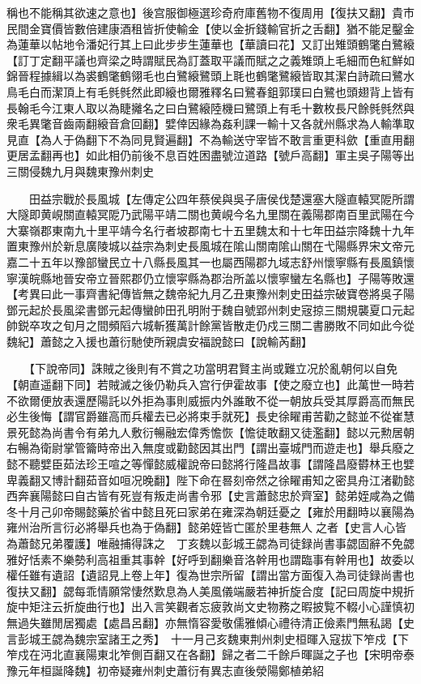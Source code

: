 稱也不能稱其欲速之意也】後宫服御極選珍奇府庫舊物不復周用【復扶又翻】貴市民間金寶價皆數倍建康酒租皆折使輸金【使以金折錢輸官折之舌翻】猶不能足鑿金為蓮華以帖地令潘妃行其上曰此步步生蓮華也【華讀曰花】又訂出雉頭鶴氅白鷺縗【訂丁定翻平議也齊梁之時謂賦民為訂蓋取平議而賦之之義雉頭上毛細而色紅鮮如錦晉程據緝以為裘鶴氅鶴翎毛也白鷺縗鷺頭上毦也鶴氅鷺縗皆取其潔白詩疏曰鷺水鳥毛白而潔頂上有毛毿毿然此即縗也爾雅釋名曰鷺春鉏郭璞曰白鷺也頭翅背上皆有長翰毛今江東人取以為睫攡名之曰白鷺縗陸機曰鷺頭上有毛十數枚長尺餘毿毿然與衆毛異氅音齒兩翻縗音倉回翻】嬖倖因緣為姦利課一輸十又各就州縣求為人輸準取見直【為人于偽翻下不為同見賢遍翻】不為輸送守宰皆不敢言重更科歛【重直用翻更居孟翻再也】如此相仍前後不息百姓困盡號泣道路【號戶高翻】軍主吳子陽等出三關侵魏九月與魏東豫州刺史

　　田益宗戰於長風城【左傳定公四年蔡侯與吳子唐侯伐楚還塞大隧直轅冥阸所謂大隧即黄峴關直轅冥阸乃武陽平靖二關也黄峴今名九里關在義陽郡南百里武陽在今大寨嶺郡東南九十里平靖今名行者坡郡南七十五里魏太和十七年田益宗降魏十九年置東豫州於新息廣陵城以益宗為刺史長風城在隂山關南隂山關在弋陽縣界宋文帝元嘉二十五年以豫部蠻民立十八縣長風其一也屬西陽郡九域志舒州懷寧縣有長風鎮懷寧漢皖縣地晉安帝立晉熙郡仍立懷寜縣為郡治所盖以懷寧蠻左名縣也】子陽等敗還　【考異曰此一事齊書紀傳皆無之魏帝紀九月乙丑東豫州刺史田益宗破寶卷將吳子陽鄧元起於長風梁書鄧元起傳蠻帥田孔明附于魏自號郢州刺史宼掠三關規襲夏口元起帥鋭卒攻之旬月之間頻䧟六城斬獲萬計餘黨皆散走仍戍三關二書勝敗不同如此今從魏紀】蕭懿之入援也蕭衍馳使所親虞安福說懿曰【說輸芮翻】

　　【下說帝同】誅賊之後則有不賞之功當明君賢主尚或難立况於亂朝何以自免【朝直遥翻下同】若賊滅之後仍勒兵入宫行伊霍故事【使之廢立也】此萬世一時若不欲爾便放表還歷陽託以外拒為事則威振内外誰敢不從一朝放兵受其厚爵高而無民必生後悔【謂官爵雖高而兵權去已必將束手就死】長史徐矅甫苦勸之懿並不從崔慧景死懿為尚書令有弟九人敷衍暢融宏偉秀憺恢【憺徒敢翻又徒濫翻】懿以元勲居朝右暢為衛尉掌管籥時帝出入無度或勸懿因其出門【謂出臺城門而遊走也】舉兵廢之懿不聽嬖臣茹法珍王喧之等憚懿威權說帝曰懿將行隆昌故事【謂隆昌廢欎林王也嬖卑義翻又博計翻茹音如咺况晚翻】陛下命在晷刻帝然之徐矅甫知之密具舟江渚勸懿西奔襄陽懿曰自古皆有死豈有叛走尚書令邪【史言蕭懿忠於齊室】懿弟姪咸為之備冬十月己卯帝賜懿藥於省中懿且死曰家弟在雍深為朝廷憂之【雍於用翻時以襄陽為雍州治所言衍必將舉兵也為于偽翻】懿弟姪皆亡匿於里巷無人之者【史言人心皆為蕭懿兄弟覆護】唯融捕得誅之　丁亥魏以彭城王勰為司徒録尚書事勰固辭不免勰雅好恬素不樂勢利高祖重其事幹【好呼到翻樂音洛幹用也謂臨事有幹用也】故委以權任雖有遺詔【遺詔見上卷上年】復為世宗所留【謂出當方面復入為司徒録尚書也復扶又翻】勰每乖情願常悽然歎息為人美風儀端嚴若神折旋合度【記曰周旋中規折旋中矩注云折旋曲行也】出入言笑觀者忘疲敦尚文史物務之暇披覧不輟小心謹慎初無過失雖閒居獨處【處昌呂翻】亦無惰容愛敬儒雅傾心禮待清正儉素門無私謁【史言彭城王勰為魏宗室諸王之秀】　十一月己亥魏東荆州刺史桓暉入寇拔下笮戍【下笮戍在沔北直襄陽東北笮側百翻又在各翻】歸之者二千餘戶暉誕之子也【宋明帝泰豫元年桓誕降魏】初帝疑雍州刺史蕭衍有異志直後滎陽鄭植弟紹

